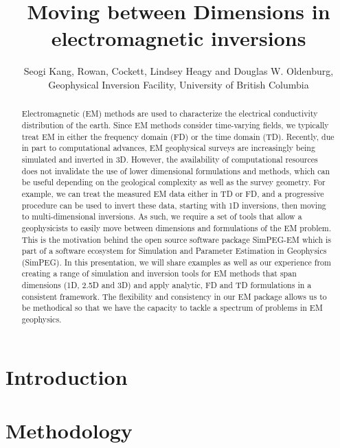 \documentclass{segabs}
\begin{document}
\title{Moving between Dimensions in electromagnetic inversions}

\renewcommand{\thefootnote}{\fnsymbol{footnote}}

\author{Seogi Kang\footnotemark[1], Rowan, Cockett, Lindsey Heagy and Douglas W. Oldenburg, Geophysical Inversion Facility, University of British Columbia}


\maketitle
\begin{abstract}
Electromagnetic (EM) methods are used to characterize the electrical conductivity distribution of the earth. Since EM methods consider time-varying fields, we typically treat EM in either the frequency domain (FD) or the time domain (TD). Recently, due in part to computational advances, EM geophysical surveys are increasingly being simulated and inverted in 3D. However, the availability of computational resources does not invalidate the use of lower dimensional formulations and methods, which can be useful depending on the geological complexity as well as the survey geometry. For example, we can treat the measured EM data either in TD or FD, and a progressive procedure can be used to invert these data, starting with 1D inversions, then moving to multi-dimensional inversions. As such, we require a set of tools that allow a geophysicists to easily move between dimensions and formulations of the EM problem. This is the motivation behind the open source software package SimPEG-EM which is part of a software ecosystem for Simulation and Parameter Estimation in Geophysics (SimPEG). In this presentation, we will share examples as well as our experience from creating a range of simulation and inversion tools for EM methods that span dimensions (1D, 2.5D and 3D) and apply analytic, FD and TD formulations in a consistent framework. The flexibility and consistency in our EM package allows us to be methodical so that we have the capacity to tackle a spectrum of problems in EM geophysics.
\end{abstract}
\renewcommand{\figdir}{Fig} %
\section{Introduction}


\section*{Methodology}
\end{document}
